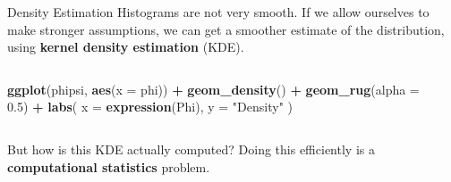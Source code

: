 \documentclass[
  ignorenonframetext,
  aspectratio=1610,
  onlytextwidth]{beamer}
\newenvironment{Shaded}{\begin{snugshade}}{\end{snugshade}}
\newcommand{\AttributeTok}[1]{\textcolor[rgb]{0.13,0.29,0.53}{#1}}
\newcommand{\FloatTok}[1]{\textcolor[rgb]{0.00,0.00,0.81}{#1}}
\newcommand{\FunctionTok}[1]{\textcolor[rgb]{0.13,0.29,0.53}{\textbf{#1}}}
\newcommand{\NormalTok}[1]{#1}
\newcommand{\SpecialCharTok}[1]{\textcolor[rgb]{0.81,0.36,0.00}{\textbf{#1}}}
\newcommand{\StringTok}[1]{\textcolor[rgb]{0.31,0.60,0.02}{#1}}
\begin{document}
\begin{frame}[fragile]{Density Estimation}
\label{density-estimation}
Histograms are not very smooth. If we allow ourselves to make stronger
assumptions, we can get a smoother estimate of the distribution, using
\textbf{kernel density estimation} (KDE).

\bigskip

\pause

\begin{columns}[T]
\begin{column}{0.47\linewidth}
\begin{Shaded}
\begin{Highlighting}[]
\FunctionTok{ggplot}\NormalTok{(phipsi, }\FunctionTok{aes}\NormalTok{(}\AttributeTok{x =}\NormalTok{ phi)) }\SpecialCharTok{+}
  \FunctionTok{geom\_density}\NormalTok{() }\SpecialCharTok{+}
  \FunctionTok{geom\_rug}\NormalTok{(}\AttributeTok{alpha =} \FloatTok{0.5}\NormalTok{) }\SpecialCharTok{+}
  \FunctionTok{labs}\NormalTok{(}
    \AttributeTok{x =} \FunctionTok{expression}\NormalTok{(Phi),}
    \AttributeTok{y =} \StringTok{"Density"}
\NormalTok{  )}
\end{Highlighting}
\end{Shaded}
\end{column}

\begin{column}{0.47\linewidth}
\end{column}
\end{columns}

\pause

But how is this KDE actually computed? Doing this efficiently is a
\textbf{computational statistics} problem.
\end{frame}
\end{document}
